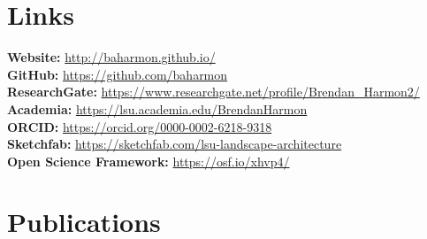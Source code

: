 \documentclass[]{baharmon_cv}
\renewcommand{\baselinestretch}{1.15}
\begin{document}
\sectiondivider


\section{Links} 
\textbf{Website:} \href{http://baharmon.github.io/}{http://baharmon.github.io/}\\ 
\textbf{GitHub:} \href{https://github.com/baharmon}{https://github.com/baharmon}\\ 
\textbf{ResearchGate:} \href{https://www.researchgate.net/profile/Brendan\_Harmon2/}{https://www.researchgate.net/profile/Brendan\_Harmon2/}\\
\textbf{Academia:} \href{https://lsu.academia.edu/BrendanHarmon}{https://lsu.academia.edu/BrendanHarmon}\\
\textbf{ORCID:} \href{https://orcid.org/0000-0002-6218-9318}{https://orcid.org/0000-0002-6218-9318}\\
\textbf{Sketchfab:} \href{https://sketchfab.com/lsu-landscape-architecture}{https://sketchfab.com/lsu-landscape-architecture}\\
\textbf{Open Science Framework:} \href{https://osf.io/xhvp4/}{https://osf.io/xhvp4/}

\pagebreak


\renewcommand{\baselinestretch}{1.1}

\section{Publications} 
\begin{refsection}
\nocite{*}
\setlength\bibitemsep{0.75em}
\sectiondivider \linebreak

\printbibliography[title={Books\vspace{0.2em}},type=book, heading=subbibliography]
\sectiondivider \linebreak

\printbibliography[title={Papers
\vspace{0.2em}},keyword=peer_reviewed, heading=subbibliography]
\sectiondivider \linebreak

\printbibliography[title={Book chapters\vspace{0.2em}},type=incollection, heading=subbibliography]
\sectiondivider \linebreak

\printbibliography[title={Select presentations\vspace{0.2em}},type=unpublished, heading=subbibliography]
\sectiondivider \linebreak

\printbibliography[title={Reports\vspace{0.2em}},type=report, heading=subbibliography]
\sectiondivider \linebreak

\end{refsection}
\end{document}
